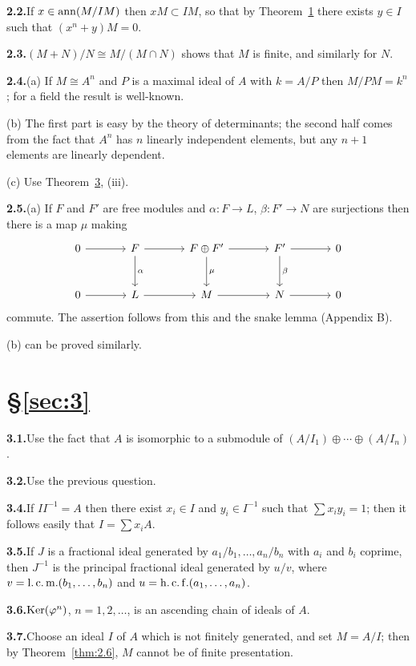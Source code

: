 \noindent\textbf{2.2.}\quad If $x \in \operatorname{ann}(M/IM)$ then $xM \subset IM$, so that by Theorem~\hyperref[thm:2.1]{1} there exists $y \in I$
such that $(x^n + y)M = 0$.

\noindent\textbf{2.3.}\quad $(M + N)/N \cong M/(M \cap N)$ shows that $M$ is finite, and similarly for $N$.

\noindent\textbf{2.4.}\quad (a) If $M \cong A^n$ and $P$ is a maximal ideal of $A$ with $k = A/P$ then $M/PM = k^n$;
for a field the result is well-known.

\smallskip
\noindent\hspace*{1.5em}(b) The first part is easy by the theory of determinants; the second half
comes from the fact that $A^n$ has $n$ linearly independent elements, but any
$n + 1$ elements are linearly dependent.

\smallskip
\noindent\hspace*{1.5em}(c) Use Theorem~\hyperref[thm:2.3]{3}, (iii).

\noindent\textbf{2.5.}\quad (a) If $F$ and $F'$ are free modules and $\alpha\colon F \to L$, $\beta\colon F' \to N$ are surjections
then there is a map $\mu$ making
\[
  \begin{tikzcd}[column sep=large, row sep=large]
    0 \arrow[r] & F \arrow[r] \arrow[d, "\alpha"] & F \oplus F' \arrow[r] \arrow[d, "\mu"] & F' \arrow[r] \arrow[d, "\beta"] & 0 \\
    0 \arrow[r] & L \arrow[r] & M \arrow[r] & N \arrow[r] & 0
  \end{tikzcd}
\]
commute. The assertion follows from this and the snake lemma
(Appendix B).

\smallskip
\noindent\hspace*{1.5em}(b) can be proved similarly.

\section*{\S\ref{sec:3}}

\noindent\textbf{3.1.}\quad Use the fact that $A$ is isomorphic to a submodule of $(A/I_1) \oplus \cdots \oplus (A/I_n)$.

\noindent\textbf{3.2.}\quad Use the previous question.

\noindent\textbf{3.4.}\quad If $II^{-1} = A$ then there exist $x_i \in I$ and $y_i \in I^{-1}$ such that $\sum x_iy_i = 1$; then it
follows easily that $I = \sum x_iA$.

\noindent\textbf{3.5.}\quad If $J$ is a fractional ideal generated by $a_1/b_1, \ldots, a_n/b_n$ with $a_i$ and
$b_i$ coprime, then $J^{-1}$ is the principal fractional ideal generated by $u/v$, where
$v = \operatorname{l.c.m.}(b_1, \ldots, b_n)$ and $u = \operatorname{h.c.f.}(a_1, \ldots, a_n)$.

\noindent\textbf{3.6.}\quad $\operatorname{Ker}(\varphi^n)$, $n = 1, 2, \ldots$, is an ascending chain of ideals of $A$.

\noindent\textbf{3.7.}\quad Choose an ideal $I$ of $A$ which is not finitely generated, and set $M = A/I$;
then by Theorem~\ref{thm:2.6}, $M$ cannot be of finite presentation.
